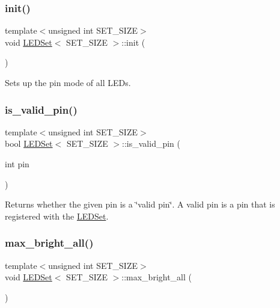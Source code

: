 \subsubsection{\texorpdfstring{init()}{init()}}
{\footnotesize\ttfamily template$<$unsigned int S\+E\+T\+\_\+\+S\+I\+ZE$>$ \\
void \hyperlink{classLEDSet}{L\+E\+D\+Set}$<$ S\+E\+T\+\_\+\+S\+I\+ZE $>$\+::init (\begin{DoxyParamCaption}{ }\end{DoxyParamCaption})\hspace{0.3cm}{\ttfamily [inline]}}



Sets up the pin mode of all L\+E\+Ds. 

\mbox{\label{classLEDSet_ab3c7ec4740bab77f762dcd48fba26579}} 
\subsubsection{\texorpdfstring{is\+\_\+valid\+\_\+pin()}{is\_valid\_pin()}}
{\footnotesize\ttfamily template$<$unsigned int S\+E\+T\+\_\+\+S\+I\+ZE$>$ \\
bool \hyperlink{classLEDSet}{L\+E\+D\+Set}$<$ S\+E\+T\+\_\+\+S\+I\+ZE $>$\+::is\+\_\+valid\+\_\+pin (\begin{DoxyParamCaption}\item[{int}]{pin }\end{DoxyParamCaption})\hspace{0.3cm}{\ttfamily [inline]}}



Returns whether the given pin is a \char`\"{}valid pin\char`\"{}. A valid pin is a pin that is registered with the \hyperlink{classLEDSet}{L\+E\+D\+Set}. 

\mbox{\label{classLEDSet_a73dae073882d369a9cc9b9a93f446157}} 
\subsubsection{\texorpdfstring{max\+\_\+bright\+\_\+all()}{max\_bright\_all()}}
{\footnotesize\ttfamily template$<$unsigned int S\+E\+T\+\_\+\+S\+I\+ZE$>$ \\
void \hyperlink{classLEDSet}{L\+E\+D\+Set}$<$ S\+E\+T\+\_\+\+S\+I\+ZE $>$\+::max\+\_\+bright\+\_\+all (\begin{DoxyParamCaption}{ }\end{DoxyParamCaption})\hspace{0.3cm}{\ttfamily [inline]}}



